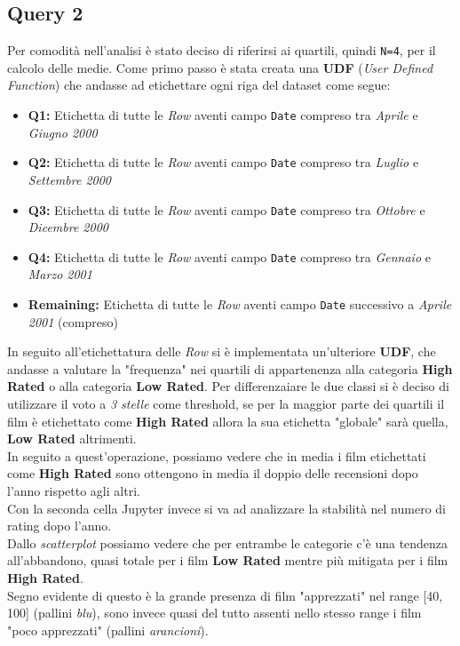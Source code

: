 \documentclass{article}
\begin{document}
    \newpage
    \subsection{Query 2}
        Per comodità nell'analisi è stato deciso di riferirsi ai quartili, quindi \texttt{N=4}, per il calcolo delle medie. Come primo passo è stata creata una \textbf{UDF} (\textit{User Defined Function}) che andasse ad etichettare ogni riga del dataset come segue:
        \begin{itemize}
            \item \textbf{Q1:} Etichetta di tutte le \textit{Row} aventi campo \texttt{Date} compreso tra \textit{Aprile} e \textit{Giugno 2000}
            \item \textbf{Q2:} Etichetta di tutte le \textit{Row} aventi campo \texttt{Date} compreso tra \textit{Luglio} e \textit{Settembre 2000}
            \item \textbf{Q3:} Etichetta di tutte le \textit{Row} aventi campo \texttt{Date} compreso tra \textit{Ottobre} e \textit{Dicembre 2000}
            \item \textbf{Q4:} Etichetta di tutte le \textit{Row} aventi campo \texttt{Date} compreso tra \textit{Gennaio} e \textit{Marzo 2001}
            \item \textbf{Remaining:} Etichetta di tutte le \textit{Row} aventi campo \texttt{Date} successivo a \textit{Aprile 2001} (compreso)
        \end{itemize}
        In seguito all'etichettatura delle \textit{Row} si è implementata un'ulteriore \textbf{UDF}, che andasse a valutare la "frequenza" nei quartili di appartenenza alla categoria \textbf{High Rated} o alla categoria \textbf{Low Rated}. Per differenzaiare le due classi si è deciso di utilizzare il voto a \textit{3 stelle} come threshold, se per la maggior parte dei quartili il film è etichettato come \textbf{High Rated} allora la sua etichetta "globale" sarà quella, \textbf{Low Rated} altrimenti.\\
        In seguito a quest'operazione, possiamo vedere che in media i film etichettati come \textbf{High Rated} sono ottengono in media il doppio delle recensioni dopo l'anno rispetto agli altri.\\
        Con la seconda cella Jupyter invece si va ad analizzare la stabilità nel numero di rating dopo l'anno.\\
        Dallo \textit{scatterplot} possiamo vedere che per entrambe le categorie c'è una tendenza all'abbandono, quasi totale per i film \textbf{Low Rated} mentre più mitigata per i film \textbf{High Rated}.\\
        Segno evidente di questo è la grande presenza di film "apprezzati" nel range [40, 100] (pallini \textit{blu}), sono invece quasi del tutto assenti nello stesso range i film "poco apprezzati" (pallini \textit{arancioni}).
    
\end{document}
